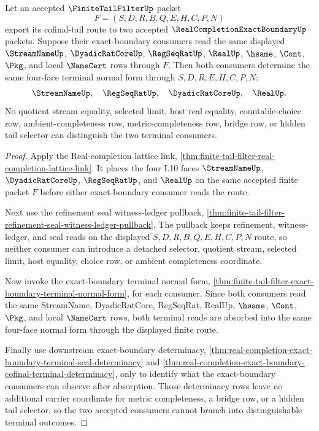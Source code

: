 \begin{theorem}
\label{thm:finite-tail-filter-exact-boundary-shared-consumer-determinacy}
Let an accepted $\FiniteTailFilterUp$ packet
$$
F=(S,D,R,B,Q,E,H,C,P,N)
$$
export its cofinal-tail route to two accepted $\RealCompletionExactBoundaryUp$ packets. Suppose their exact-boundary consumers read the same displayed $\StreamNameUp$, $\DyadicRatCoreUp$, $\RegSeqRatUp$, $\RealUp$, $\hsame$, $\Cont$, $\Pkg$, and local $\NameCert$ rows through $F$. Then both consumers determine the same four-face terminal normal form through $S,D,R,E,H,C,P,N$:
$$
\StreamNameUp,\quad \RegSeqRatUp,\quad \DyadicRatCoreUp,\quad \RealUp.
$$
No quotient stream equality, selected limit, host real equality, countable-choice row, ambient-completeness row, metric-completeness row, bridge row, or hidden tail selector can distinguish the two terminal consumers.
\end{theorem}
\begin{proof}
Apply the Real-completion lattice link, \autoref{thm:finite-tail-filter-real-completion-lattice-link}. It places the four L10 faces $\StreamNameUp$, $\DyadicRatCoreUp$, $\RegSeqRatUp$, and $\RealUp$ on the same accepted finite packet $F$ before either exact-boundary consumer reads the route.

Next use the refinement seal witness-ledger pullback, \autoref{thm:finite-tail-filter-refinement-seal-witness-ledger-pullback}. The pullback keeps refinement, witness-ledger, and seal reads on the displayed $S,D,R,B,Q,E,H,C,P,N$ route, so neither consumer can introduce a detached selector, quotient stream, selected limit, host equality, choice row, or ambient completeness coordinate.

Now invoke the exact-boundary terminal normal form, \autoref{thm:finite-tail-filter-exact-boundary-terminal-normal-form}, for each consumer. Since both consumers read the same StreamName, DyadicRatCore, RegSeqRat, RealUp, $\hsame$, $\Cont$, $\Pkg$, and local $\NameCert$ rows, both terminal reads are absorbed into the same four-face normal form through the displayed finite route.

Finally use downstream exact-boundary determinacy, \autoref{thm:real-completion-exact-boundary-terminal-seal-determinacy} and \autoref{thm:real-completion-exact-boundary-cofinal-terminal-determinacy}, only to identify what the exact-boundary consumers can observe after absorption. Those determinacy rows leave no additional carrier coordinate for metric completeness, a bridge row, or a hidden tail selector, so the two accepted consumers cannot branch into distinguishable terminal outcomes.
\end{proof}

